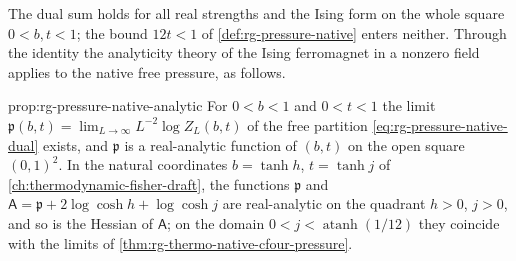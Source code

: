 The dual sum holds for all real strengths and the Ising form on the whole
square $0<b,t<1$; the bound $12t<1$ of \cref{def:rg-pressure-native} enters
neither. Through the identity the analyticity theory of the Ising
ferromagnet in a nonzero field applies to the native free pressure, as
follows.

{prop:rg-pressure-native-analytic}
For $0<b<1$ and $0<t<1$ the limit
$\mathfrak p(b,t)=\lim_{L\to\infty}L^{-2}\log Z_L(b,t)$ of the free
partition \cref{eq:rg-pressure-native-dual} exists, and $\mathfrak p$ is a
real-analytic function of $(b,t)$ on the open square $(0,1)^2$. In the
natural coordinates $b=\tanh h$, $t=\tanh j$ of
\cref{ch:thermodynamic-fisher-draft}, the functions
$\mathfrak p$ and $\mathsf A=\mathfrak p+2\log\cosh h+\log\cosh j$ are
real-analytic on the quadrant $h>0$, $j>0$, and so is the Hessian of
$\mathsf A$; on the domain $0<j<\operatorname{atanh}(1/12)$ they coincide
with the limits of \cref{thm:rg-thermo-native-cfour-pressure}.

